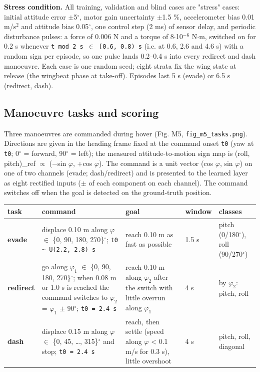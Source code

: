 \documentclass[10pt,a4paper]{article}
\begin{document}
\textbf{Stress condition.} All training, validation and blind cases are "stress" cases: initial attitude error $\pm$5$^\circ$, motor gain uncertainty $\pm$1.5 \%, accelerometer bias 0.01 m/s$^{2}$ and attitude bias 0.05$^\circ$, one control step (2 ms) of sensor delay, and periodic disturbance pulses: a force of 0.006 N and a torque of 8$\cdot$10$^{-6}$ N$\cdot$m, switched on for 0.2 s whenever \texttt{t mod 2 s $\in$ [0.6, 0.8) s} (i.e. at 0.6, 2.6 and 4.6 s) with a random sign per episode, so one pulse lands 0.2--0.4 s into every redirect and dash manoeuvre. Each case is one random seed; eight strata fix the wing state at release (the wingbeat phase at take-off). Episodes last 5 s (evade) or 6.5 s (redirect, dash).

\subsection{Manoeuvre tasks and scoring}

Three manoeuvres are commanded during hover (Fig. M5, \texttt{fig\_m5\_tasks.png}). Directions are given in the heading frame fixed at the command onset \texttt{t0} (yaw at \texttt{t0}; 0$^\circ$ = forward, 90$^\circ$ = left); the measured attitude-to-motion sign map is (roll, pitch)\_ref $\propto$ ($-$sin $\varphi$, +cos $\varphi$). The command is a unit vector (cos $\varphi$, sin $\varphi$) on one of two channels (evade; dash/redirect) and is presented to the learned layer as eight rectified inputs ($\pm$ of each component on each channel). The command switches off when the goal is detected on the ground-truth position.

\begin{table}[htbp]\centering\scriptsize
\begin{tabularx}{\textwidth}{lXXlX}\toprule
task & command & goal & window & classes \\ \midrule
\textbf{evade} & displace 0.10 m along $\varphi$ $\in$ \{0, 90, 180, 270\}$^\circ$; \texttt{t0 \textasciitilde{} U(2.2, 2.8) s} & reach 0.10 m as fast as possible & 1.5 s & pitch (0/180$^\circ$), roll (90/270$^\circ$) \\
\textbf{redirect} & go along $\varphi_1$ $\in$ \{0, 90, 180, 270\}$^\circ$; when 0.08 m or 1.0 s is reached the command switches to $\varphi_2$ = $\varphi_1$ $\pm$ 90$^\circ$; \texttt{t0 = 2.4 s} & reach 0.10 m along $\varphi_2$ after the switch with little overrun along $\varphi_1$ & 4 s & by $\varphi_2$: pitch, roll \\
\textbf{dash} & displace 0.15 m along $\varphi$ $\in$ \{0, 45, \ldots{}, 315\}$^\circ$ and stop; \texttt{t0 = 2.4 s} & reach, then settle (speed along $\varphi$ < 0.1 m/s for 0.3 s), little overshoot & 4 s & pitch, roll, diagonal \\
\bottomrule\end{tabularx}\end{table}
\end{document}
